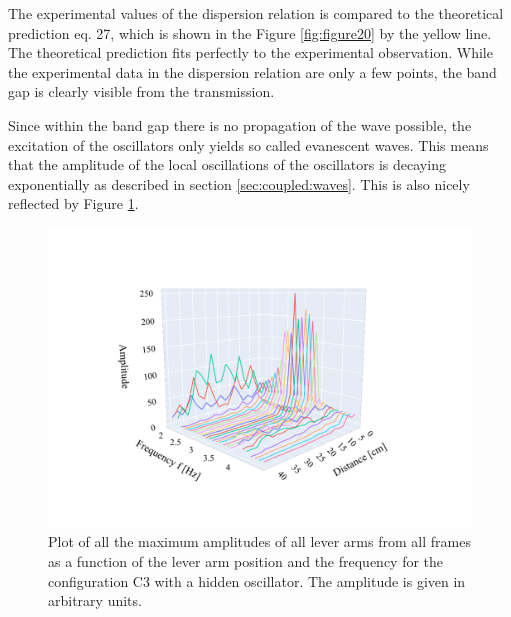 \documentclass[12pt]{article}
\begin{document}
The experimental values of the dispersion relation is compared to the theoretical prediction eq. 27, which is shown in the Figure \ref{fig:figure20} by the yellow line. The theoretical prediction fits perfectly to the experimental observation. While the experimental data in the dispersion relation are only a few points, the band gap is clearly visible from the transmission.

Since within the band gap there is no propagation of the wave possible, the excitation of the oscillators only yields so called evanescent waves. This means that the amplitude of the local oscillations of the oscillators is decaying exponentially as described in section \ref{sec:coupled:waves}. This is also nicely reflected by Figure \ref{fig:figure21}.
\begin{figure}[hbt] 
\includegraphics[width=.8\textwidth]{evanescent.pdf}
\caption{Plot of all the maximum amplitudes of all lever arms from all frames  as a function of the lever arm position and the frequency for the configuration C3 with a hidden oscillator. The amplitude is given in arbitrary units. }\label{fig:figure21}
\end{figure}
\end{document}
